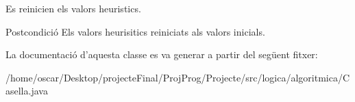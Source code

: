 Es reinicien els valors heuristics. 

\begin{DoxyPostcond}{Postcondició}
Els valors heurisitics reiniciats als valors inicials. 
\end{DoxyPostcond}


La documentació d'aquesta classe es va generar a partir del següent fitxer\+:\begin{DoxyCompactItemize}
\item 
/home/oscar/\+Desktop/projecte\+Final/\+Proj\+Prog/\+Projecte/src/logica/algoritmica/Casella.\+java\end{DoxyCompactItemize}
